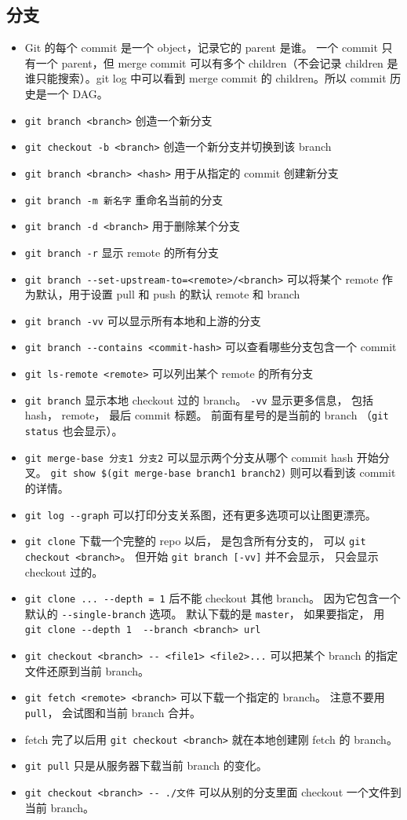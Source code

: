 \subsection{分支}
\begin{itemize}
\item Git 的每个 commit 是一个 object，记录它的 parent 是谁。 一个 commit 只有一个 parent，但 merge commit 可以有多个 children（不会记录 children 是谁只能搜索）。git log 中可以看到 merge commit 的 children。所以 commit 历史是一个 DAG。
\item \verb`git branch <branch>` 创造一个新分支
\item \verb`git checkout -b <branch>` 创造一个新分支并切换到该 branch
\item \verb`git branch <branch> <hash>` 用于从指定的 commit 创建新分支
\item \verb`git branch -m 新名字` 重命名当前的分支
\item \verb`git branch -d <branch>` 用于删除某个分支
\item \verb`git branch -r` 显示 remote 的所有分支
\item \verb`git branch --set-upstream-to=<remote>/<branch>` 可以将某个 remote 作为默认，用于设置 pull 和 push 的默认 remote 和 branch
\item \verb`git branch -vv` 可以显示所有本地和上游的分支
\item \verb`git branch --contains <commit-hash>` 可以查看哪些分支包含一个 commit
\item \verb`git ls-remote <remote>` 可以列出某个 remote 的所有分支
\item \verb`git branch` 显示本地 checkout 过的 branch。 \verb`-vv` 显示更多信息， 包括 hash， remote， 最后 commit 标题。 前面有星号的是当前的 branch （\verb`git status` 也会显示）。
\item \verb`git merge-base 分支1 分支2` 可以显示两个分支从哪个 commit hash 开始分叉。 \verb`git show $(git merge-base branch1 branch2)` 则可以看到该 commit 的详情。
\item \verb`git log --graph` 可以打印分支关系图，还有更多选项可以让图更漂亮。
\item \verb`git clone` 下载一个完整的 repo 以后， 是包含所有分支的， 可以 \verb`git checkout <branch>`。 但开始 \verb`git branch [-vv]` 并不会显示， 只会显示 checkout 过的。
\item \verb`git clone ... --depth = 1` 后不能 checkout 其他 branch。 因为它包含一个默认的 \verb`--single-branch` 选项。 默认下载的是 \verb`master`， 如果要指定， 用 \verb`git clone --depth 1  --branch <branch> url`
\item \verb`git checkout <branch> -- <file1> <file2>...` 可以把某个 branch 的指定文件还原到当前 branch。
\item \verb`git fetch <remote> <branch>` 可以下载一个指定的 branch。 注意不要用 \verb`pull`， 会试图和当前 branch 合并。
\item fetch 完了以后用 \verb`git checkout <branch>` 就在本地创建刚 fetch 的 branch。
\item \verb`git pull` 只是从服务器下载当前 branch 的变化。
\item \verb`git checkout <branch> -- ./文件` 可以从别的分支里面 checkout 一个文件到当前 branch。


\end{itemize}
